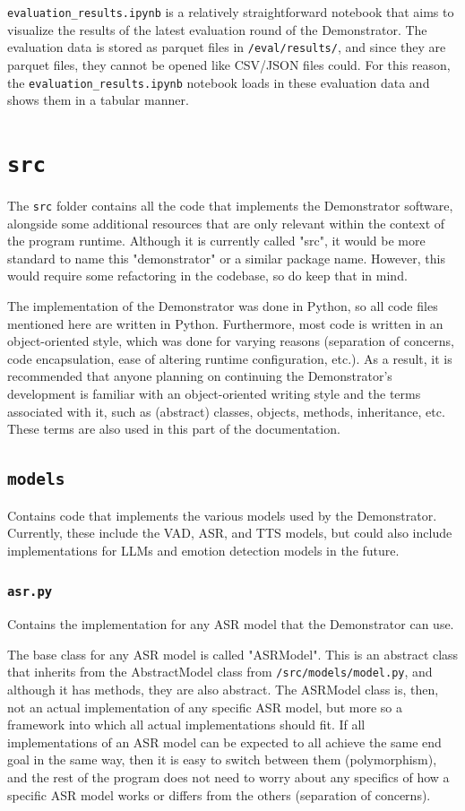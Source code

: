 \texttt{evaluation\_results.ipynb} is a relatively straightforward notebook that aims to visualize the results of the latest evaluation round of the Demonstrator.
The evaluation data is stored as parquet files in \texttt{/eval/results/}, and since they are parquet files, they cannot be opened like CSV/JSON files could.
For this reason, the \texttt{evaluation\_results.ipynb} notebook loads in these evaluation data and shows them in a tabular manner.

\section{\texttt{src}}
The \texttt{src} folder contains all the code that implements the Demonstrator software, alongside some additional resources that are only relevant within the context of the program runtime.
Although it is currently called "src", it would be more standard to name this "demonstrator" or a similar package name.
However, this would require some refactoring in the codebase, so do keep that in mind.

The implementation of the Demonstrator was done in Python, so all code files mentioned here are written in Python.
Furthermore, most code is written in an object-oriented style, which was done for varying reasons (separation of concerns, code encapsulation, ease of altering runtime configuration, etc.).
As a result, it is recommended that anyone planning on continuing the Demonstrator's development is familiar with an object-oriented writing style and the terms associated with it, such as (abstract) classes, objects, methods, inheritance, etc.
These terms are also used in this part of the documentation.

\subsection{\texttt{models}}
Contains code that implements the various models used by the Demonstrator.
Currently, these include the VAD, ASR, and TTS models, but could also include implementations for LLMs and emotion detection models in the future.

\subsubsection{\texttt{asr.py}}
Contains the implementation for any ASR model that the Demonstrator can use.

The base class for any ASR model is called "ASRModel".
This is an abstract class that inherits from the AbstractModel class from \texttt{/src/models/model.py}, and although it has methods, they are also abstract.
The ASRModel class is, then, not an actual implementation of any specific ASR model, but more so a framework into which all actual implementations should fit.
If all implementations of an ASR model can be expected to all achieve the same end goal in the same way, then it is easy to switch between them (polymorphism), and the rest of the program does not need to worry about any specifics of how a specific ASR model works or differs from the others (separation of concerns).


